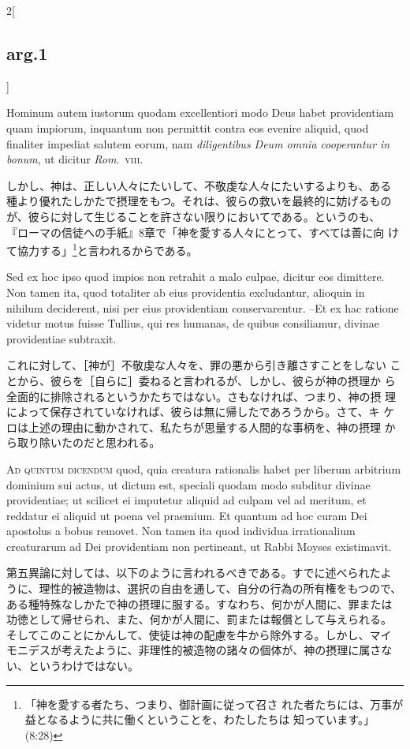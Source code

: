 \documentclass[paper=a4paper,fontsize=10pt,jafontsize=9pt,titlepage]{jlreq}
\begin{document}
\begin{paracol}{2}[\subsection{arg.1}]
\switchcolumn*

Hominum autem iustorum quodam
excellentiori modo Deus habet providentiam quam impiorum, inquantum non
permittit contra eos evenire aliquid, quod finaliter impediat salutem
eorum, nam {\itshape diligentibus Deum omnia cooperantur in bonum}, ut dicitur
{\itshape Rom}.~{\scshape viii}.

\switchcolumn

しかし、神は、正しい人々にたいして、不敬虔な人々にたいするよりも、ある
種より優れたしかたで摂理をもつ。それは、彼らの救いを最終的に妨げるもの
が、彼らに対して生じることを許さない限りにおいてである。というのも、
『ローマの信徒への手紙』8章で「神を愛する人々にとって、すべては善に向
けて協力する」\footnote{「神を愛する者たち、つまり、御計画に従って召さ
れた者たちには、万事が益となるように共に働くということを、わたしたちは
知っています。」(8:28)}と言われるからである。

\switchcolumn*

Sed ex hoc ipso quod impios non retrahit a malo culpae,
dicitur eos dimittere. 
Non tamen ita, quod totaliter ab eius providentia
excludantur, alioquin in nihilum deciderent, nisi per eius providentiam
conservarentur. --Et ex hac ratione videtur motus fuisse Tullius, qui res
humanas, de quibus consiliamur, divinae providentiae subtraxit.

\switchcolumn

これに対して、［神が］不敬虔な人々を、罪の悪から引き離さすことをしない
ことから、彼らを［自らに］委ねると言われるが、しかし、彼らが神の摂理か
ら全面的に排除されるというかたちではない。さもなければ、つまり、神の摂
理によって保存されていなければ、彼らは無に帰したであろうから。さて、キ
ケロは上述の理由に動かされて、私たちが思量する人間的な事柄を、神の摂理
から取り除いたのだと思われる。

\switchcolumn*[\subsection{ad.5}]

{\scshape Ad quintum dicendum} quod, quia creatura
rationalis habet per liberum arbitrium dominium sui actus, ut dictum
est, speciali quodam modo subditur divinae providentiae; ut scilicet ei
imputetur aliquid ad culpam vel ad meritum, et reddatur ei aliquid ut
poena vel praemium. Et quantum ad hoc curam Dei apostolus a bobus
removet. Non tamen ita quod individua irrationalium creaturarum ad Dei
providentiam non pertineant, ut Rabbi Moyses existimavit.

\switchcolumn

第五異論に対しては、以下のように言われるべきである。すでに述べられたよ
うに、理性的被造物は、選択の自由を通して、自分の行為の所有権をもつので、
ある種特殊なしかたで神の摂理に服する。すなわち、何かが人間に、罪または
功徳として帰せられ、また、何かが人間に、罰または報償として与えられる。
そしてこのことにかんして、使徒は神の配慮を牛から除外する。しかし、マイ
モニデスが考えたように、非理性的被造物の諸々の個体が、神の摂理に属さな
い、というわけではない。

\end{paracol}
\end{document}
